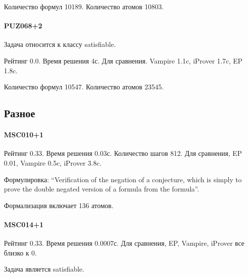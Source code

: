 Количество формул 10189. Количество атомов 10803.


\paragraph{PUZ068+2}
Задача относится к классу satisfiable.

Рейтинг 0.0. Время решения 4с. Для сравнения. Vampire 1.1c, iProver 1.7c, EP 1.8c.


Количество формул 10547. Количество атомов 23545.




\subsection{Разное}





\paragraph{MSC010+1}
Рейтинг 0.33. Время решения 0.03с. Количество шагов 812. Для сравнения, EP 0.01, Vampire 0.5c, iProver 3.8c.

Формулировка: ``Verification of the negation of a conjecture, which is simply to prove the double negated version of a formula from the formula''.

Формализация включает 136 атомов.



\paragraph{MSC014+1}
Рейтинг 0.33. Время решения 0.0007с. Для сравнения, EP, Vampire, iProver все близко к 0.

Задача является satisfiable.

